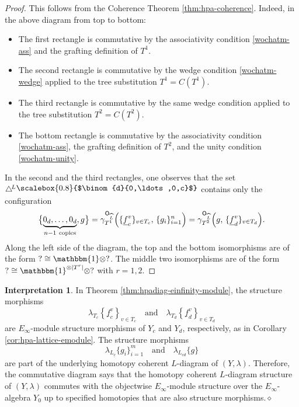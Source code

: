 \documentclass[11pt]{amsbook}
\numberwithin{section}{chapter}
\numberwithin{subsection}{section}
\numberwithin{equation}{section}
\theoremstyle{plain}
\theoremstyle{definition}
\newtheorem{interpretation}[equation]{Interpretation}
\renewcommand{\O}{\mathsf{O}}
\newcommand{\tensorunit}{\mathbbm{1}}
\newcommand{\dqed}{\hfill$\diamond$}
\newcommand{\Config}{\triangle} %
\newcommand{\Configl}{\Config^{\! L}}
\newcommand{\Lhat}{\widehat{L}}
\newcommand{\Olhat}{\O_{\Lhat}}
\newcommand{\uc}{\underline c}
\newcommand{\uf}{\underline f}
\newcommand{\smallprof}[1]
{\raisebox{.05cm}{\scalebox{0.8}{#1}}}
\newcommand{\dzerozeroc}{\smallprof{$\binom{d}{0,\ldots,0,c}$}}
\newcommand{\andspace}{\quad\text{and}\quad}
\begin{document}
\begin{proof}
This follows from the Coherence Theorem \ref{thm:hpa-coherence}.  Indeed, in the above diagram from top to bottom:
\begin{itemize}\item The first rectangle is commutative by the associativity condition \eqref{wochatm-ass} and the grafting definition of $T^1$.
\item The second rectangle is commutative by the wedge condition \eqref{wochatm-wedge} applied to the tree substitution $T^1 = C(T^1)$.
\item The third rectangle is commutative by the same wedge condition applied to the tree substitution $T^2 = C(T^2)$.
\item The bottom rectangle is commutative by the associativity condition \eqref{wochatm-ass}, the grafting definition of $T^2$, and the unity condition \eqref{wochatm-unity}.
\end{itemize}
In the second and the third rectangles, one observes that the set $\Configl\dzerozeroc$ contains only the configuration \[\bigl\{\underbrace{0_d,\ldots, 0_d}_{n-1~\mathrm{copies}}, g\bigr\} = \gamma^{\Olhat}_{T^1}\Bigl(\{\uf^v_c\}_{v\in T_c},\, \{g_i\}_{i=1}^n\Bigr) = \gamma^{\Olhat}_{T^2}\Bigl(g,\,\{\uf^v_d\}_{v\in T_d}\Bigr).\] Along the left side of the diagram, the top and the bottom isomorphisms are of the form $? \cong \tensorunit \otimes ?$.  The middle two isomorphisms are of the form $? \cong \tensorunit^{\otimes |T^r|}\otimes ?$ with $r=1,2$.
\end{proof}

\begin{interpretation} In Theorem \ref{thm:hpadiag-einfinity-module}, the structure morphisms \[\lambda_{T_c}\left\{\uf^v_c\right\}_{v\in T_c} \andspace \lambda_{T_d}\left\{\uf^v_d\right\}_{v\in T_d}\] are $E_\infty$-module structure morphisms of $Y_c$ and $Y_d$, respectively, as in Corollary \ref{cor:hpa-lattice-emodule}.  The structure morphisms \[\lambda_{L_{\uc}}\{g_i\}_{i=1}^m \andspace \lambda_{L_{cd}}\{g\}\] are part of the underlying homotopy coherent $L$-diagram of $(Y,\lambda)$.  Therefore, the commutative diagram says that the homotopy coherent $L$-diagram structure of $(Y,\lambda)$ commutes with the objectwise $E_\infty$-module structure over the $E_\infty$-algebra $Y_0$ up to specified homotopies that are also structure morphisms.\dqed
\end{interpretation}
\end{document}
